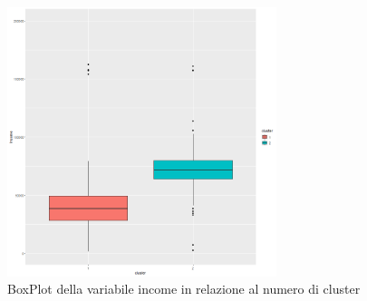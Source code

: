 \documentclass[letterpaper,11pt]{article}
\begin{document}
\begin{figure}[H]
    \centering
    \includegraphics[width=0.7\textwidth]{Img/K-MEANS/KMEANS012.png}
    \caption{BoxPlot della variabile income in relazione al numero di cluster}
    \label{fig:incomeKmeansBoxPlot}
\end{figure}
\end{document}
